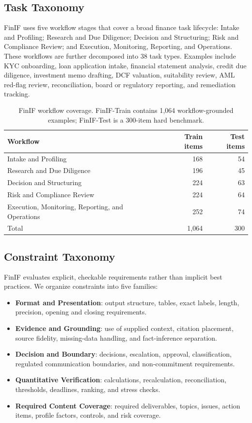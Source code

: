 \documentclass[11pt]{article}
\begin{document}
\subsection{Task Taxonomy}

FinIF uses five workflow stages that cover a broad finance task lifecycle: Intake and Profiling; Research and Due Diligence; Decision and Structuring; Risk and Compliance Review; and Execution, Monitoring, Reporting, and Operations. These workflows are further decomposed into 38 task types. Examples include KYC onboarding, loan application intake, financial statement analysis, credit due diligence, investment memo drafting, DCF valuation, suitability review, AML red-flag review, reconciliation, board or regulatory reporting, and remediation tracking.

\begin{table}[t]
\centering
\small
\begin{tabular}{lrr}
\toprule
Workflow & Train items & Test items \\
\midrule
Intake and Profiling & 168 & 54 \\
Research and Due Diligence & 196 & 45 \\
Decision and Structuring & 224 & 63 \\
Risk and Compliance Review & 224 & 64 \\
Execution, Monitoring, Reporting, and Operations & 252 & 74 \\
\midrule
Total & 1,064 & 300 \\
\bottomrule
\end{tabular}
\caption{FinIF workflow coverage. FinIF-Train contains 1,064 workflow-grounded examples; FinIF-Test is a 300-item hard benchmark.}
\label{tab:workflow}
\end{table}

\subsection{Constraint Taxonomy}

FinIF evaluates explicit, checkable requirements rather than implicit best practices. We organize constraints into five families:
\begin{itemize}
    \item \textbf{Format and Presentation}: output structure, tables, exact labels, length, precision, opening and closing requirements.
    \item \textbf{Evidence and Grounding}: use of supplied context, citation placement, source fidelity, missing-data handling, and fact-inference separation.
    \item \textbf{Decision and Boundary}: decisions, escalation, approval, classification, regulated communication boundaries, and non-commitment requirements.
    \item \textbf{Quantitative Verification}: calculations, recalculation, reconciliation, thresholds, deadlines, ranking, and stress checks.
    \item \textbf{Required Content Coverage}: required deliverables, topics, issues, action items, profile factors, controls, and risk coverage.
\end{itemize}
\end{document}
